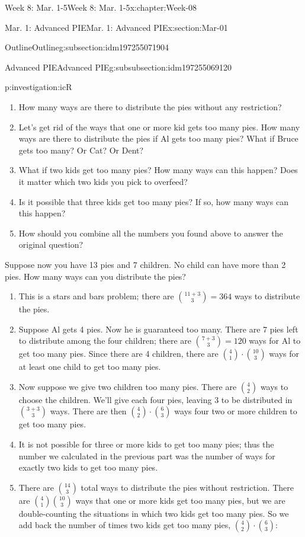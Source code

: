 \documentclass[oneside,10pt,]{book}
\numberwithin{equation}{section}
\begin{document}
\begin{chapterptx}{Week 8: Mar. 1-5}{}{Week 8: Mar. 1-5}{}{}{x:chapter:Week-08}
\begin{sectionptx}{Mar. 1: Advanced PIE}{}{Mar. 1: Advanced PIE}{}{}{x:section:Mar-01}
\begin{subsectionptx}{Outline}{}{Outline}{}{}{g:subsection:idm197255071904}
\begin{subsubsectionptx}{Advanced PIE}{}{Advanced PIE}{}{}{g:subsubsection:idm197255069120}
\begin{investigation}{}{p:investigation:icR}
\begin{enumerate}
\item{}How many ways are there to distribute the pies without any restriction?%
\item{}Let's get rid of the ways that one or more kid gets too many pies. How many ways are there to distribute the pies if Al gets too many pies? What if Bruce gets too many? Or Cat? Or Dent?%
\item{}What if two kids get too many pies? How many ways can this happen? Does it matter which two kids you pick to overfeed?%
\item{}Is it possible that three kids get too many pies? If so, how many ways can this happen?%
\item{}How should you combine all the numbers you found above to answer the original question?%
\end{enumerate}
%
\par
Suppose now you have 13 pies and 7 children. No child can have more than 2 pies. How many ways can you distribute the pies?%
\par\smallskip%
\noindent\hypertarget{g:solution:idm197255059440}{}%
\begin{enumerate}
\item{}This is a stars and bars problem; there are \(\binom{11+3}{3} = 364\) ways to distribute the pies.%
\item{}Suppose Al gets 4 pies. Now he is guaranteed too many. There are 7 pies left to distribute among the four children; there are \(\binom{7 + 3}{3} = 120\) ways for Al to get too many pies. Since there are 4 children, there are \(\binom{4}{1} \cdot \binom{10}{3}\) ways for at least one child to get too many pies.%
\item{}Now suppose we give two children too many pies. There are \(\binom{4}{2}\) ways to choose the children. We'll give each four pies, leaving 3 to be distributed in \(\binom{3+3}{3}\) ways. There are then \(\binom{4}{2}\cdot \binom{6}{3}\) ways four two or more children to get too many pies.%
\item{}It is not possible for three or more kids to get too many pies; thus the number we calculated in the previous part was the number of ways for exactly two kids to get too many pies.%
\item{}There are \(\binom{14}{3}\) total ways to distribute the pies without restriction. There are \(\binom{4}{1}\binom{10}{3}\) ways that one or more kids get too many pies, but we are double-counting the situations in which two kids get too many pies. So we add back the number of times two kids get too many pies, \(\binom{4}{2}\cdot \binom{6}{3}\):%

\end{enumerate}
\end{investigation}
\end{subsubsectionptx}
\end{subsectionptx}
\end{sectionptx}
\end{chapterptx}
\end{document}
